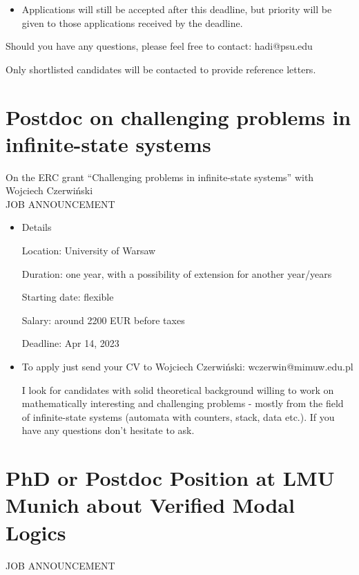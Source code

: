 \documentclass[prodmode,acmtecs]{acmsmall} %
\begin{document}
\begin{itemize}
\begin{itemize}\item  Applications will still be accepted after this deadline, but priority will be given to those applications received by the deadline.
\end{itemize} 
  Should you have any questions, please feel free to contact: hadi@psu.edu 
 
  Only shortlisted candidates will be contacted to provide reference letters. 
 
\end{itemize}\section{Postdoc on challenging problems in infinite-state systems}\label{Postdoconchallengingproblemsininfinitestatesystems}  On the ERC grant ``Challenging problems in infinite-state systems'' with Wojciech Czerwiński\\ 
JOB ANNOUNCEMENT 

\begin{itemize}\item  Details 
 
  Location: University of Warsaw 
 
  Duration: one year, with a possibility of extension for another year/years 
 
  Starting date: flexible  
 
  Salary: around 2200 EUR before taxes 
 
Deadline: Apr 14, 2023 
 
\item  To apply just send your CV to Wojciech Czerwiński: wczerwin@mimuw.edu.pl 
 
  I look for candidates with solid theoretical background willing to work on mathematically interesting and challenging problems - mostly from the field of infinite-state systems (automata with counters, stack, data etc.). If you have any questions don’t hesitate to ask. 
 
\end{itemize}\section{PhD or Postdoc Position at LMU Munich about Verified Modal Logics}\label{PhDorPostdocPositionatLMUMunichaboutVerifiedModalLogics}JOB ANNOUNCEMENT 
\end{document}
